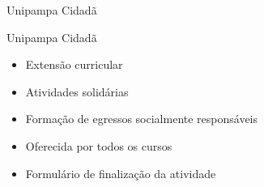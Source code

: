 
\begin{frame}{{\sffamily Unipampa Cidadã}}
\begin{block}{Unipampa Cidadã}
    \begin{itemize}
        \item Extensão curricular
        \item Atividades solidárias %
        \item Formação de egressos socialmente responsáveis %
        \item Oferecida por todos os cursos 
        \item Formulário de finalização da atividade
    \end{itemize}
\end{block}
\end{frame}
